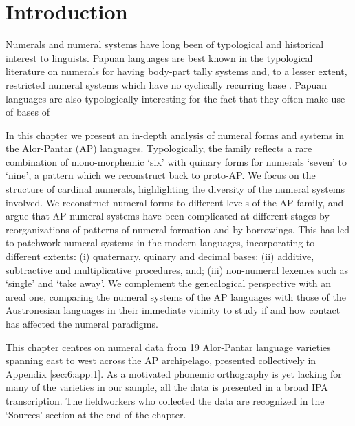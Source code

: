 
\renewcommand{\thesection}{\arabic{section}} 
 
\section{Introduction}

\hypertarget{Toc376958477}{}Numerals and numeral systems have long been of typological and historical interest to linguists. Papuan languages are best known in the typological literature on numerals for having body-part tally systems and, to a lesser extent, restricted numeral systems which have no cyclically recurring base{} \citep{Laycock1975,Lean1992,Comrie2005numsys}. Papuan languages are also typologically interesting for the fact that they often make use of bases of  

In this chapter we present an in-depth analysis of numeral forms and systems in the Alor-Pantar (AP) languages. Typologically, the family reflects a rare combination of mono-morphemic `six' with quinary forms for numerals `seven' to `nine', a pattern which we reconstruct back to proto-AP. We focus on the structure of cardinal numerals, highlighting the diversity of the numeral systems involved. We reconstruct numeral forms to different levels of the AP family, and argue that AP numeral systems have been complicated at different stages by reorganizations of patterns of numeral formation and by borrowings. This has led to patchwork numeral systems in the modern languages, incorporating to different extents: (i) quaternary, quinary and decimal bases; (ii) additive, subtractive and multiplicative procedures, and; (iii) non-numeral lexemes such as `single' and `take away'. We complement the genealogical perspective with an areal one, comparing the numeral systems of the AP languages with those of the Austronesian languages in their immediate vicinity to study if and how contact has affected the numeral paradigms.

This chapter centres on numeral data from 19 Alor-Pantar language varieties spanning east to west across the AP archipelago, presented collectively in Appendix \ref{sec:6:app:1}. As a motivated phonemic orthography is yet lacking for many of the varieties in our sample, all the data is presented in a broad IPA transcription. The fieldworkers who collected the data are recognized in the `Sources' section at the end of the chapter. 


